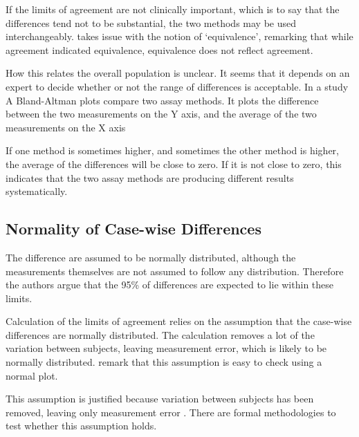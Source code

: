 \documentclass[12pt, a4paper]{report}
\theoremstyle{plain}
\theoremstyle{definition}
\theoremstyle{remark}
\begin{document}
If the limits of agreement are not clinically important, which is
to say that the differences tend not to be substantial, the two
methods may be used interchangeably. \citet{DunnSEME} takes issue
with the notion of `equivalence', remarking that while agreement
indicated equivalence, equivalence does not reflect agreement.



How this relates the overall population is unclear. It seems that
it depends on an expert to decide whether or not the range of
differences is acceptable. In a study A Bland-Altman plots compare
two assay methods. It plots the difference between the two
measurements on the Y axis, and the average of the two
measurements on the X axis

	
	If one method is sometimes higher, and sometimes the other method is higher, the average of the differences will be close to zero.
	If it is not close to zero, this indicates that the two assay methods are producing different results systematically.

\subsection{Normality of Case-wise Differences}	
The difference are assumed to be normally distributed, although the measurements themselves are not assumed to follow any distribution. Therefore the authors argue that the 95\% of differences are expected to lie within these limits. 

Calculation of the limits of agreement relies on the assumption that the case-wise differences are normally distributed.
The calculation removes a lot of the variation between subjects,  leaving measurement error, which is likely to be normally distributed.\citet{BA99} remark that this assumption is easy to check using a normal plot. 


This assumption is justified because variation between subjects has been removed, leaving only measurement error \citep{BA86}. There are formal methodologies to test whether this assumption holds.

\end{document}
